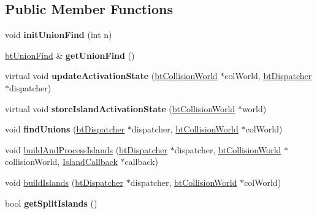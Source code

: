 \subsection*{Public Member Functions}
\begin{DoxyCompactItemize}
\item 
\hypertarget{classbt_simulation_island_manager_ab9c747e8d11c29f7537c82483280b20d}{void {\bfseries init\+Union\+Find} (int n)}\label{classbt_simulation_island_manager_ab9c747e8d11c29f7537c82483280b20d}

\item 
\hypertarget{classbt_simulation_island_manager_a5a2829a514e99ec4731501b19f21ad29}{\hyperlink{classbt_union_find}{bt\+Union\+Find} \& {\bfseries get\+Union\+Find} ()}\label{classbt_simulation_island_manager_a5a2829a514e99ec4731501b19f21ad29}

\item 
\hypertarget{classbt_simulation_island_manager_a61c895f8349447d567d42bd6a3ba769f}{virtual void {\bfseries update\+Activation\+State} (\hyperlink{classbt_collision_world}{bt\+Collision\+World} $\ast$col\+World, \hyperlink{classbt_dispatcher}{bt\+Dispatcher} $\ast$dispatcher)}\label{classbt_simulation_island_manager_a61c895f8349447d567d42bd6a3ba769f}

\item 
\hypertarget{classbt_simulation_island_manager_a136d82abf91b4fd489f7338d456a95d3}{virtual void {\bfseries store\+Island\+Activation\+State} (\hyperlink{classbt_collision_world}{bt\+Collision\+World} $\ast$world)}\label{classbt_simulation_island_manager_a136d82abf91b4fd489f7338d456a95d3}

\item 
\hypertarget{classbt_simulation_island_manager_a3fd9a1a91e254d3f5736b71e48f9e7cc}{void {\bfseries find\+Unions} (\hyperlink{classbt_dispatcher}{bt\+Dispatcher} $\ast$dispatcher, \hyperlink{classbt_collision_world}{bt\+Collision\+World} $\ast$col\+World)}\label{classbt_simulation_island_manager_a3fd9a1a91e254d3f5736b71e48f9e7cc}

\item 
void \hyperlink{classbt_simulation_island_manager_ab0f52dc46bc01c6754f4cb32ba26c99a}{build\+And\+Process\+Islands} (\hyperlink{classbt_dispatcher}{bt\+Dispatcher} $\ast$dispatcher, \hyperlink{classbt_collision_world}{bt\+Collision\+World} $\ast$collision\+World, \hyperlink{structbt_simulation_island_manager_1_1_island_callback}{Island\+Callback} $\ast$callback)
\item 
void \hyperlink{classbt_simulation_island_manager_aea0b5869eca2d034ac9c643e149a5e01}{build\+Islands} (\hyperlink{classbt_dispatcher}{bt\+Dispatcher} $\ast$dispatcher, \hyperlink{classbt_collision_world}{bt\+Collision\+World} $\ast$col\+World)
\item 
\hypertarget{classbt_simulation_island_manager_ae18b05fce2ab10d425ba0ec0aff0336e}{bool {\bfseries get\+Split\+Islands} ()}\label{classbt_simulation_island_manager_ae18b05fce2ab10d425ba0ec0aff0336e}


\end{DoxyCompactItemize}
